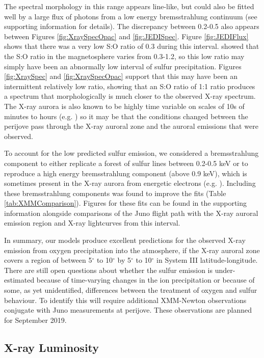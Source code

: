 \documentclass[draft]{agujournal2018}
\begin{document}
The spectral morphology in this range appears line-like, but could also be fitted well by a large flux of photons from a low energy bremsstrahlung continuum (see supporting information for details).
The discrepancy between 0.2-0.5 also appears between Figures \ref{fig:XraySpecOpac} and \ref{fig:JEDISpec}. Figure \ref{fig:JEDIFlux} shows that there was a very low S:O ratio of 0.3 during this interval.
\citet{radioti2005,radioti2006} showed that the S:O ratio in the magnetosphere varies from 0.3-1.2, so this low ratio may simply have been an abnormally low interval of sulfur precipitation.
Figures \ref{fig:XraySpec} and \ref{fig:XraySpecOpac} support that this may have been an intermittent relatively low ratio, showing that an S:O ratio of 1:1 ratio produces a spectrum that morphologically is much closer to the observed X-ray spectrum.
The X-ray aurora is also known to be highly time variable on scales of 10s of minutes to hours (e.g. \citet{dunn2017}) so it may be that the conditions changed between the perijove pass through the X-ray auroral zone and the auroral emissions that were observed.

To account for the low predicted sulfur emission, we considered a bremsstrahlung component to either replicate a forest of sulfur lines between 0.2-0.5 keV or to reproduce a high energy bremsstrahlung component (above 0.9 keV), which is sometimes present in the X-ray aurora from energetic electrons (e.g. \citet{branduardi2004,branduardi2008}).
Including these bremsstrahlung components was found to improve the fits (Table \ref{tab:XMMComparison}).
Figures for these fits can be found in the supporting information alongside comparisons of the Juno flight path with the X-ray auroral emission region and X-ray lightcurves from this interval.

In summary, our models produce excellent predictions for the observed X-ray emission from oxygen precipitation into the atmosphere, if the X-ray auroral zone covers a region of between 5$^{\circ}$ to 10$^{\circ}$ by 5$^{\circ}$ to 10$^{\circ}$ in System III latitude-longitude.
There are still open questions about whether the sulfur emission is under-estimated because of time-varying changes in the ion precipitation or because of some, as yet unidentified, differences between the treatment of oxygen and sulfur behaviour.
To identify this will require additional XMM-Newton observations conjugate with Juno measurements at perijove.
These observations are planned for September 2019.

\subsection{X-ray Luminosity}
\end{document}
